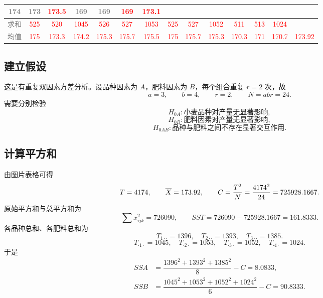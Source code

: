 \documentclass{article}
\newcommand{\barline}[1]{\overline{#1\rule{0pt}{1.5ex}}}
\begin{document}
\begin{center}
{\begin{tabular}{|c|c|c|c|c|c|c|c|c|c|c|c|c|c|}
            \textcolor{gray}{174} & \textcolor{gray}{173} & \textcolor{red}{173.5} &
            \textcolor{gray}{169} & \textcolor{gray}{169} & \textcolor{red}{169} &
            \textcolor{red}{173.1} \\
            \hline
            \textcolor{gray}{求和} &
            \textcolor{red}{525} & \textcolor{red}{520} & \textcolor{red}{1045} &
            \textcolor{red}{526} & \textcolor{red}{527} & \textcolor{red}{1053} &
            \textcolor{red}{525} & \textcolor{red}{527} & \textcolor{red}{1052} &
            \textcolor{red}{511} & \textcolor{red}{513} & \textcolor{red}{1024} &
             \\
            \hline
            \textcolor{gray}{均值} &
            \textcolor{red}{175} & \textcolor{red}{173.3} & \textcolor{red}{174.2} &
            \textcolor{red}{175.3} & \textcolor{red}{175.7} & \textcolor{red}{175.5} &
            \textcolor{red}{175} & \textcolor{red}{175.7} & \textcolor{red}{175.3} &
            \textcolor{red}{170.3} & \textcolor{red}{171} & \textcolor{red}{170.7} &
            \textcolor{red}{173.92} \\
            \hline
        \end{tabular}
    }
\end{center}

\subsection{建立假设}

这是有重复双因素方差分析。设品种因素为 $A$，肥料因素为 $B$，每个组合重复 $r=2$ 次，故
\[
    a=3,\qquad b=4,\qquad r=2,\qquad N=abr=24.
\]
需要分别检验
\[
    H_{0A}:\text{小麦品种对产量无显著影响},
\]
\[
    H_{0B}:\text{肥料因素对产量无显著影响},
\]
\[
    H_{0AB}:\text{品种与肥料之间不存在显著交互作用}.
\]

\subsection{计算平方和}

由图片表格可得
\[
    T=4174,\qquad \barline{X}=173.92,\qquad
    C=\dfrac{T^2}{N}=\dfrac{4174^2}{24}=725928.1667.
\]
原始平方和与总平方和为
\[
    \sum x_{ijk}^{2}=726090,\qquad
    SST=726090-725928.1667=161.8333.
\]
各品种总和、各肥料总和为
\[
    T_{1\cdot\cdot}=1396,\quad T_{2\cdot\cdot}=1393,\quad T_{3\cdot\cdot}=1385.
\]
\[
    T_{\cdot 1\cdot}=1045,\quad T_{\cdot 2\cdot}=1053,\quad
    T_{\cdot 3\cdot}=1052,\quad T_{\cdot 4\cdot}=1024.
\]
于是
\[
\begin{aligned}
    SSA&=\dfrac{1396^2+1393^2+1385^2}{8}-C=8.0833,\\
    SSB&=\dfrac{1045^2+1053^2+1052^2+1024^2}{6}-C=90.8333.
\end{aligned}
\]
\end{document}

